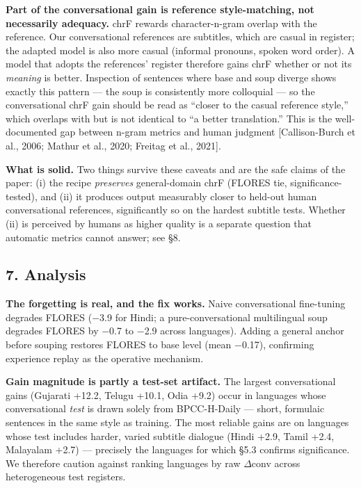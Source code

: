 \documentclass[
  11pt,
]{article}
\begin{document}
\textbf{Part of the conversational gain is reference style-matching, not
necessarily adequacy.} chrF rewards character-n-gram overlap with the
reference. Our conversational references are subtitles, which are casual
in register; the adapted model is also more casual (informal pronouns,
spoken word order). A model that adopts the references' register
therefore gains chrF whether or not its \emph{meaning} is better.
Inspection of sentences where base and soup diverge shows exactly this
pattern --- the soup is consistently more colloquial --- so the
conversational chrF gain should be read as ``closer to the casual
reference style,'' which overlaps with but is not identical to ``a
better translation.'' This is the well-documented gap between n-gram
metrics and human judgment {[}Callison-Burch et al., 2006; Mathur et
al., 2020; Freitag et al., 2021{]}.

\textbf{What is solid.} Two things survive these caveats and are the
safe claims of the paper: (i) the recipe \emph{preserves} general-domain
chrF (FLORES tie, significance-tested), and (ii) it produces output
measurably closer to held-out human conversational references,
significantly so on the hardest subtitle tests. Whether (ii) is
perceived by humans as higher quality is a separate question that
automatic metrics cannot answer; see §8.

\hypertarget{analysis}{%
\subsection{7. Analysis}\label{analysis}}

\textbf{The forgetting is real, and the fix works.} Naive conversational
fine-tuning degrades FLORES ($-$3.9 for Hindi; a pure-conversational
multilingual soup degrades FLORES by $-$0.7 to $-$2.9 across languages).
Adding a general anchor before souping restores FLORES to base level
(mean $-$0.17), confirming experience replay as the operative mechanism.

\textbf{Gain magnitude is partly a test-set artifact.} The largest
conversational gains (Gujarati +12.2, Telugu +10.1, Odia +9.2) occur in
languages whose conversational \emph{test} is drawn solely from
BPCC-H-Daily --- short, formulaic sentences in the same style as
training. The most reliable gains are on languages whose test includes
harder, varied subtitle dialogue (Hindi +2.9, Tamil +2.4, Malayalam
+2.7) --- precisely the languages for which §5.3 confirms significance.
We therefore caution against ranking languages by raw $\Delta$conv across
heterogeneous test registers.
\end{document}
